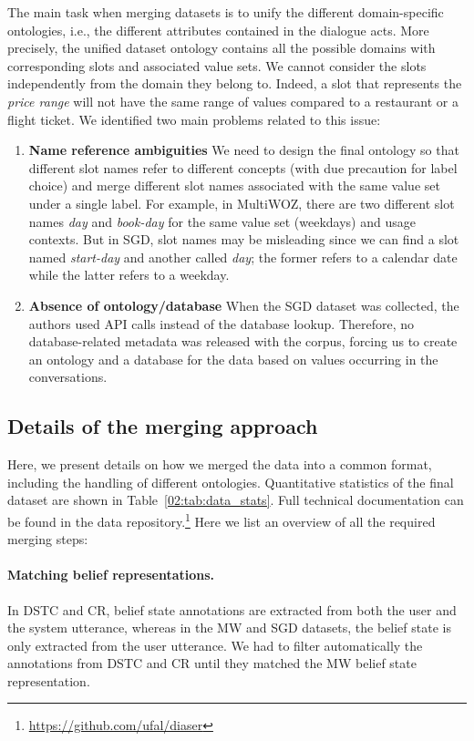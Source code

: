 The main task when merging datasets is to unify the different domain-specific ontologies, i.e., the different attributes contained in the dialogue acts.
More precisely, the unified dataset ontology contains all the possible domains with corresponding slots and associated value sets.
We cannot consider the slots independently from the domain they belong to.
Indeed, a slot that represents the \textit{price range} will not have the same range of values compared to a restaurant or a flight ticket.
We identified two main problems related to this issue:
\begin{enumerate}
    \item \textbf{Name reference ambiguities}
    We need to design the final ontology so that different slot names refer to different concepts (with due precaution for label choice) and merge different slot names associated with the same value set under a single label.
    For example, in MultiWOZ, there are two different slot names \textit{day} and \textit{book-day} for the same value set (weekdays) and usage contexts.
    But in SGD, slot names may be misleading since we can find a slot named \textit{start-day} and another called \textit{day}; the former refers to a calendar date while the latter refers to a weekday.
    
    \item \textbf{Absence of ontology/database} When the SGD dataset was collected, the authors used API calls instead of the database lookup.
    Therefore, no database-related metadata was released with the corpus, forcing us to create an ontology and a database for the data based on values occurring in the conversations.
\end{enumerate}

\subsection{Details of the merging approach}
Here, we present details on how we merged the data into a common format, including the handling of different ontologies.
Quantitative statistics of the final dataset are shown in Table~\ref{02:tab:data_stats}.
Full technical documentation can be found in the data repository.\footnote{\url{https://github.com/ufal/diaser}}
Here we list an overview of all the required merging steps:

\paragraph{Matching belief representations.} In DSTC and CR, belief state annotations are extracted from both the user and the system utterance, whereas in the MW and SGD datasets, the belief state is only extracted from the user utterance. We had to filter automatically the annotations from DSTC and CR until they matched the MW belief state representation. 
    
